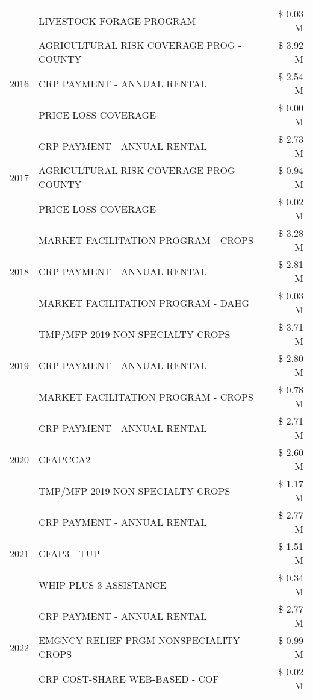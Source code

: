 \begin{tabular}{llr}
 & LIVESTOCK FORAGE PROGRAM & \$ 0.03 M \\
\cline{1-3}
\multirow[t]{3}{*}{2016} & AGRICULTURAL RISK COVERAGE PROG - COUNTY & \$ 3.92 M \\
 & CRP PAYMENT - ANNUAL RENTAL & \$ 2.54 M \\
 & PRICE LOSS COVERAGE & \$ 0.00 M \\
\cline{1-3}
\multirow[t]{3}{*}{2017} & CRP PAYMENT - ANNUAL RENTAL & \$ 2.73 M \\
 & AGRICULTURAL RISK COVERAGE PROG - COUNTY & \$ 0.94 M \\
 & PRICE LOSS COVERAGE & \$ 0.02 M \\
\cline{1-3}
\multirow[t]{3}{*}{2018} & MARKET FACILITATION PROGRAM - CROPS & \$ 3.28 M \\
 & CRP PAYMENT - ANNUAL RENTAL & \$ 2.81 M \\
 & MARKET FACILITATION PROGRAM - DAHG & \$ 0.03 M \\
\cline{1-3}
\multirow[t]{3}{*}{2019} & TMP/MFP 2019 NON SPECIALTY CROPS & \$ 3.71 M \\
 & CRP PAYMENT - ANNUAL RENTAL & \$ 2.80 M \\
 & MARKET FACILITATION PROGRAM - CROPS & \$ 0.78 M \\
\cline{1-3}
\multirow[t]{3}{*}{2020} & CRP PAYMENT - ANNUAL RENTAL & \$ 2.71 M \\
 & CFAPCCA2 & \$ 2.60 M \\
 & TMP/MFP 2019 NON SPECIALTY CROPS & \$ 1.17 M \\
\cline{1-3}
\multirow[t]{3}{*}{2021} & CRP PAYMENT - ANNUAL RENTAL & \$ 2.77 M \\
 & CFAP3 - TUP & \$ 1.51 M \\
 & WHIP PLUS 3 ASSISTANCE & \$ 0.34 M \\
\cline{1-3}
\multirow[t]{3}{*}{2022} & CRP PAYMENT - ANNUAL RENTAL & \$ 2.77 M \\
 & EMGNCY RELIEF PRGM-NONSPECIALITY CROPS & \$ 0.99 M \\
 & CRP COST-SHARE WEB-BASED - COF & \$ 0.02 M \\
\cline{1-3}
\bottomrule
\end{tabular}
